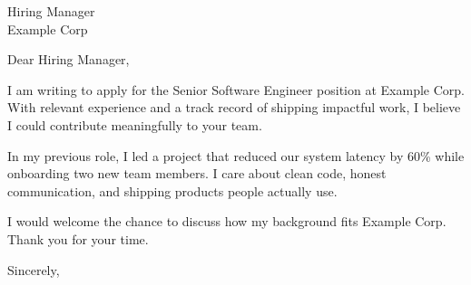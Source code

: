 \begin{letter}{Hiring Manager \\ Example Corp}

\opening{Dear Hiring Manager,}

I am writing to apply for the Senior Software Engineer position at Example Corp.
With relevant experience and a track record of shipping impactful work, I believe
I could contribute meaningfully to your team.

In my previous role, I led a project that reduced our system latency by 60\%
while onboarding two new team members. I care about clean code, honest
communication, and shipping products people actually use.

I would welcome the chance to discuss how my background fits Example Corp.
Thank you for your time.

\closing{Sincerely,}

\end{letter}
